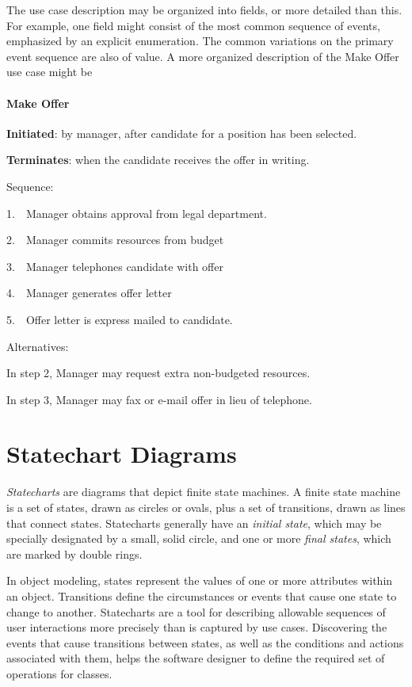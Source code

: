 The use case description may be organized into fields, or more
detailed than this. For example, one field might consist of the
most common sequence of events, emphasized by an explicit enumeration.
The common variations on the primary event sequence are also of
value. A more organized description of the Make Offer use case might
be

\paragraph[Make Offer]{\bfseries Make Offer}
\textbf{Initiated}: by manager, after candidate for a position has been
selected.

\textbf{Terminates}: when the candidate receives the offer in writing.

Sequence:

1.\ \ Manager obtains approval from legal department.

2.\ \ Manager commits resources from budget

3.\ \ Manager telephones candidate with offer

4.\ \ Manager generates offer letter

5.\ \ Offer letter is express mailed to candidate.

Alternatives:

In step 2, Manager may request extra non-budgeted resources.

In step 3, Manager may fax or e-mail offer in lieu of telephone.

\section{Statechart Diagrams}

\textit{Statecharts} are diagrams that depict finite
state machines. A finite state machine is a
set of states, drawn as circles or ovals, plus a set of transitions,
drawn as lines that connect states. Statecharts generally have an
\textit{initial state}, which may be specially designated by a small,
solid circle, and one or more \textit{final states}, which are marked
by double rings.

In object modeling, states represent the values of one or more
attributes within an object. Transitions define the circumstances or
events that cause one state to change to another. Statecharts are a
tool for describing allowable sequences of user interactions more
precisely than is captured by use cases. Discovering the events that
cause transitions between states, as well as the conditions and actions
associated with them, helps the software designer to define the
required set of operations for classes.

